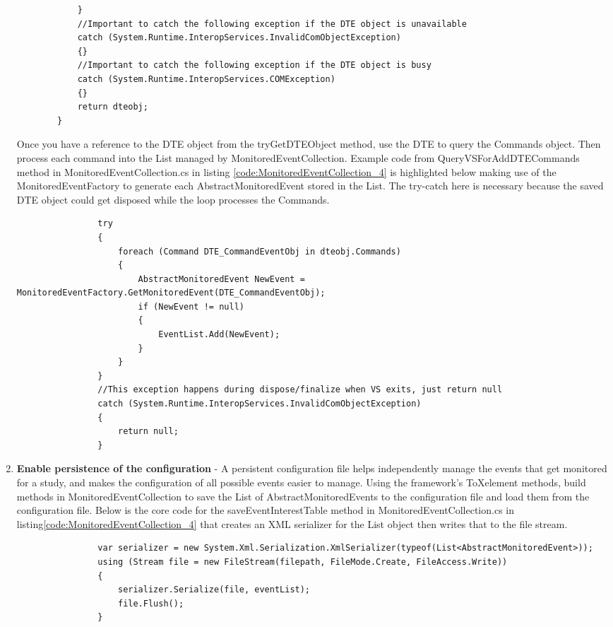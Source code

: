 \begin{enumerate}
\begin{lstlisting}
			}
			//Important to catch the following exception if the DTE object is unavailable
			catch (System.Runtime.InteropServices.InvalidComObjectException)
			{} 
			//Important to catch the following exception if the DTE object is busy
			catch (System.Runtime.InteropServices.COMException)
			{}
			return dteobj;
		}

\end{lstlisting}

Once you have a reference to the DTE object from the tryGetDTEObject method, use the DTE to query the Commands  object.  Then process each command into the List managed by MonitoredEventCollection.  Example code from QueryVSForAddDTECommands method in MonitoredEventCollection.cs in listing \ref{code:MonitoredEventCollection_4} is highlighted below making use of the MonitoredEventFactory to generate each AbstractMonitoredEvent stored in the List.  The try-catch here is necessary because the saved DTE object could get disposed while the loop processes the Commands.

\begin{lstlisting}
                try
                {
                    foreach (Command DTE_CommandEventObj in dteobj.Commands)
                    {
                        AbstractMonitoredEvent NewEvent = MonitoredEventFactory.GetMonitoredEvent(DTE_CommandEventObj);
                        if (NewEvent != null)
                        {
                            EventList.Add(NewEvent);
                        }
                    }
                }
                //This exception happens during dispose/finalize when VS exits, just return null
                catch (System.Runtime.InteropServices.InvalidComObjectException)
                {
                    return null;
                }
\end{lstlisting}

\item {\bf Enable persistence of the configuration} -
A persistent configuration file helps independently manage the events that get monitored for a study, and makes the configuration of all possible events easier to manage.    Using the framework's ToXelement methods, build methods in MonitoredEventCollection to save the List of AbstractMonitoredEvents to the configuration file and load them from the configuration file.  Below is the core code for the saveEventInterestTable method in MonitoredEventCollection.cs in listing\ref{code:MonitoredEventCollection_4} that creates an XML serializer for the List object then writes that to the file stream.  

\begin{lstlisting}
                var serializer = new System.Xml.Serialization.XmlSerializer(typeof(List<AbstractMonitoredEvent>));
                using (Stream file = new FileStream(filepath, FileMode.Create, FileAccess.Write))
                {
                    serializer.Serialize(file, eventList);
                    file.Flush();
                }
\end{lstlisting}

\end{enumerate}



